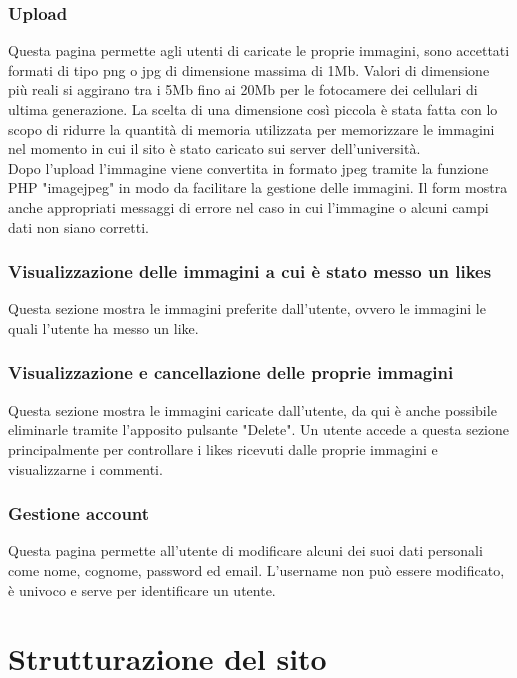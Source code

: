 \documentclass[openany, a4paper, 12pt]{report}
\begin{document}
		\subsubsection{Upload}
		Questa pagina permette agli utenti di caricate le proprie immagini, sono accettati formati di tipo png o jpg di dimensione massima di 1Mb. Valori di dimensione più reali si aggirano tra i 5Mb fino ai 20Mb per le fotocamere dei cellulari di ultima generazione. La scelta di una dimensione così piccola è stata fatta con lo scopo di ridurre la quantità di memoria utilizzata per memorizzare le immagini nel momento in cui il sito è stato caricato sui server dell'università.\\
		Dopo l'upload l'immagine viene convertita in formato jpeg tramite la funzione PHP "imagejpeg" in modo da facilitare la gestione delle immagini. Il form mostra anche appropriati messaggi di errore nel caso in cui l'immagine o alcuni campi dati non siano corretti.
		
		\subsubsection{Visualizzazione delle immagini a cui è stato messo un likes}
		Questa sezione mostra le immagini preferite dall'utente, ovvero le immagini le quali l'utente ha messo un like.
		
		\subsubsection{Visualizzazione e cancellazione delle proprie immagini}
		Questa sezione mostra le immagini caricate dall'utente, da qui è anche possibile eliminarle tramite l'apposito pulsante "Delete". Un utente accede a questa sezione principalmente per controllare i likes ricevuti dalle proprie immagini e visualizzarne i commenti.
		
		\subsubsection{Gestione account}
		Questa pagina permette all'utente di modificare alcuni dei suoi dati personali come nome, cognome, password ed email. L'username non può essere modificato, è univoco e serve per identificare un utente.

	\section{Strutturazione del sito}
\end{document}
